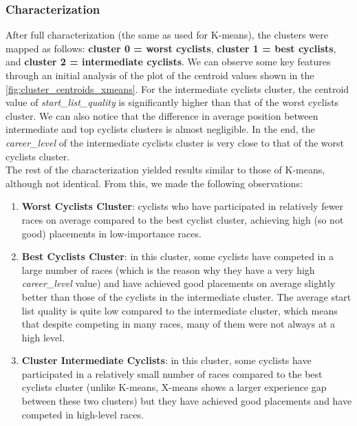 \subsubsection{Characterization}

After full characterization (the same as used for K-means), the clusters were mapped as follows: \textbf{cluster 0 = worst cyclists}, \textbf{cluster 1 = best cyclists}, and \textbf{cluster 2 = intermediate cyclists}. We can observe some key features through an initial analysis of the plot of the centroid values shown in the \autoref{fig:cluster_centroids_xmeans}.
For the intermediate cyclists cluster, the centroid value of \textit{start\_list\_quality} is significantly higher than that of the worst cyclists cluster. We can also notice that the difference in average position between intermediate and top cyclists clusters is almost negligible. In the end, the \textit{career\_level} of the intermediate cyclists cluster is very close to that of the worst cyclists cluster.\\

\noindent
The rest of the characterization yielded results similar to those of K-means, although not identical. From this, we made the following observations:
\begin{enumerate}
    \item \textbf{Worst Cyclists Cluster}: cyclists who have participated in relatively fewer races on average compared to the best cyclist cluster, achieving high (so not good) placements in low-importance races.

    \item \textbf{Best Cyclists Cluster}:  
    in this cluster, some cyclists have competed in a large number of races (which is the reason why they have a very high \textit{career\_level} value) and have achieved good placements on average slightly better than those of the cyclists in the intermediate cluster. The average start list quality is quite low compared to the intermediate cluster, which means that despite competing in many races, many of them were not always at a high level.

    \item \textbf{Cluster Intermediate Cyclists}:  
    in this cluster, some cyclists have participated in a relatively small number of races compared to the best cyclists cluster (unlike K-means, X-means shows a larger experience gap between these two clusters) but they have achieved good placements and have competed in high-level races.
\end{enumerate}

